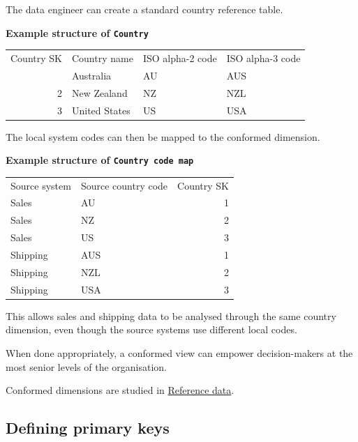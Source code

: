 \documentclass[10pt,openany,10pt]{book}
\newcounter{none}
\let\podeToprule\toprule
\let\podeMidrule\midrule
\let\podeBottomrule\bottomrule
\renewcommand{\toprule}{\arrayrulecolor{pbiGrid}\podeToprule}
\renewcommand{\midrule}{\arrayrulecolor{pbiGrid}\podeMidrule}
\renewcommand{\bottomrule}{\arrayrulecolor{pbiGrid}\podeBottomrule}
\begin{document}
The data engineer can create a standard country reference table.

\textbf{Example structure of
\texttt{\textquotesingle{}Country\textquotesingle{}}}

{\def\LTcaptype{none} %
\begin{longtable}[]{@{}rlll@{}}
\toprule\noalign{}
Country SK & Country name & ISO alpha-2 code & ISO alpha-3 code \\
\midrule\noalign{}
\endhead
\bottomrule\noalign{}
\endlastfoot
1 & Australia & AU & AUS \\
2 & New Zealand & NZ & NZL \\
3 & United States & US & USA \\
\end{longtable}
}

The local system codes can then be mapped to the conformed dimension.

\textbf{Example structure of
\texttt{\textquotesingle{}Country\ code\ map\textquotesingle{}}}

{\def\LTcaptype{none} %
\begin{longtable}[]{@{}llr@{}}
\toprule\noalign{}
Source system & Source country code & Country SK \\
\midrule\noalign{}
\endhead
\bottomrule\noalign{}
\endlastfoot
Sales & AU & 1 \\
Sales & NZ & 2 \\
Sales & US & 3 \\
Shipping & AUS & 1 \\
Shipping & NZL & 2 \\
Shipping & USA & 3 \\
\end{longtable}
}

This allows sales and shipping data to be analysed through the same
country dimension, even though the source systems use different local
codes.

When done appropriately, a conformed view can empower decision-makers at
the most senior levels of the organisation.

Conformed dimensions are studied in
\hyperref[docs-creating-information-reference-data]{Reference data}.

\subsection{Defining primary keys}\label{defining-primary-keys}
\end{document}
